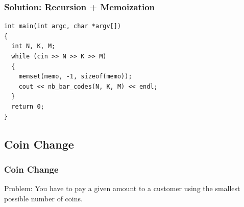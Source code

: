 \documentclass{beamer}
\begin{document}
\begin{frame}[containsverbatim]
\frametitle{Solution: Recursion + Memoization}

\scriptsize
\begin{lstlisting}
int main(int argc, char *argv[])
{
  int N, K, M;
  while (cin >> N >> K >> M)
  {
    memset(memo, -1, sizeof(memo));
    cout << nb_bar_codes(N, K, M) << endl;
  }
  return 0;
}
\end{lstlisting}

\end{frame}

\fi

\subsection{Coin Change}

\begin{frame}%
\frametitle{Coin Change}

\begin{mdframed}[style=exampledefault]
Problem: You have to pay a given amount to a customer using the smallest possible number of coins.
\end{mdframed}

\vspace{0.3cm}


\end{frame}
\end{document}

